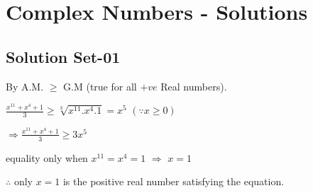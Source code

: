 \chapter[Complex Numbers - Solutions]{Complex Numbers - Solutions}
\section[Solution Set-01]{Solution Set-01}

	\begin{solution}
		By A.M. $\ge$ G.M  (true for all $+ve$ Real numbers).

		$\frac{x^{11} + x^4 + 1}{3} \ge \sqrt[3]{x^{11} . x^4 . 1} = x^5$  $(\because x \ge 0)$

		$\Rightarrow \frac{x^11 + x^4 + 1}{3} \ge 3x^5$

		equality only when $x^{11} = x^4 = 1$  $\Rightarrow$ $x=1$

		$\therefore $ only $x=1$ is the positive real number satisfying the equation.
	\end{solution}

